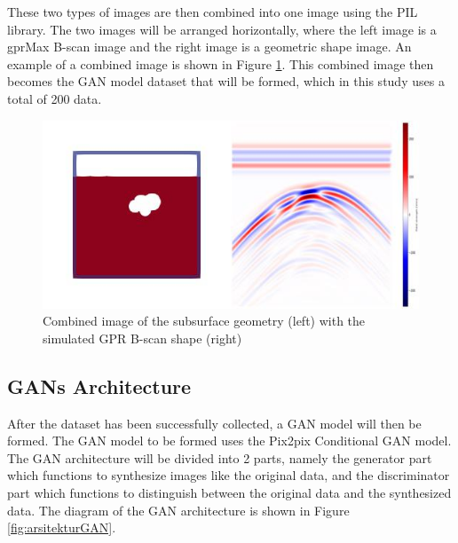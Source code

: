 \documentclass[conference]{IEEEtran}
\begin{document}
These two types of images are then combined into one image using the PIL library. 
The two images will be arranged horizontally, where the left image is a gprMax B-scan image and the right image is a geometric shape image. 
An example of a combined image is shown in Figure \ref{fig:contohdata}. 
This combined image then becomes the GAN model dataset that will be formed, which in this study uses a total of 200 data.

\begin{figure}[ht]
  \centering
  \includegraphics[scale=0.5]{gambar/data1.jpg}
  \caption{Combined image of the subsurface geometry (left) with the simulated GPR B-scan shape (right)}
  \label{fig:contohdata}
\end{figure}

\subsection{GANs Architecture}
After the dataset has been successfully collected, a GAN model will then be formed. 
The GAN model to be formed uses the Pix2pix Conditional GAN model. 
The GAN architecture will be divided into 2 parts, namely the generator part which functions to synthesize images like the original data, and the discriminator part which functions to distinguish between the original data and the synthesized data. 
The diagram of the GAN architecture is shown in Figure \ref{fig:arsitekturGAN}.
\end{document}
